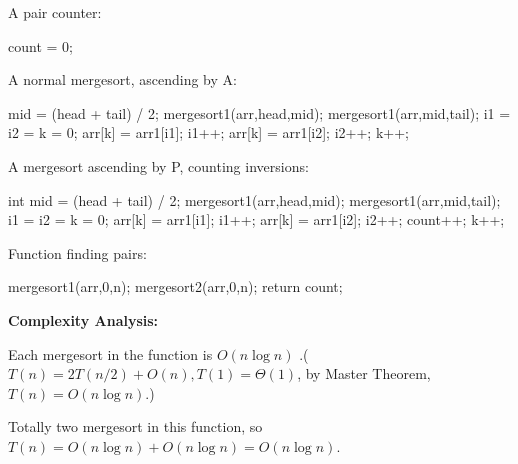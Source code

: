 \documentclass{article}
\begin{document}
A pair counter:
\begin{algorithm}[H]
	\begin{algorithmic}[1]
		\State count = 0;
	\end{algorithmic}
\end{algorithm}
A normal mergesort, ascending by A:
\begin{algorithm}[H]
	\begin{algorithmic}[1]
		\State mid = (head + tail) / 2;
		\State mergesort1(arr,head,mid);
		\State mergesort1(arr,mid,tail);
		\State i1 = i2 = k = 0;
		\State arr[k] = arr1[i1];
		\State i1++;
		\Else
		\State arr[k] = arr1[i2];
		\State i2++;
		\EndIf
		\State k++;
		\EndWhile
		\EndFunction
	\end{algorithmic}
\end{algorithm}

A mergesort ascending by P, counting inversions:
\begin{algorithm}[H]
	\begin{algorithmic}[1]
		\State int mid = (head + tail) / 2;
		\State mergesort1(arr,head,mid);
		\State mergesort1(arr,mid,tail);
		\State i1 = i2 = k = 0;
		\State arr[k] = arr1[i1];
		\State i1++;
		\Else
		\State arr[k] = arr1[i2];
		\State i2++;
		\State count++;
		\EndIf
		\State k++;
		\EndWhile
		\EndFunction
	\end{algorithmic}
\end{algorithm}

Function finding pairs:
\begin{algorithm}[H]
	\begin{algorithmic}[1]

		\State mergesort1(arr,0,n);
		\State mergesort2(arr,0,n);
		\State return count;
		\EndFunction

	\end{algorithmic}
\end{algorithm}

\textbf{Complexity Analysis:}

Each mergesort in the function is $O(n\log n)$ .($T(n)=2T(n/2)+O(n),T(1)=\Theta(1)$, by Master Theorem, $T(n)=O(n\log n)$.)

Totally two mergesort in this function, so $T(n)=O(n\log n)+O(n\log n)=O(n\log n)$.
\end{document}
